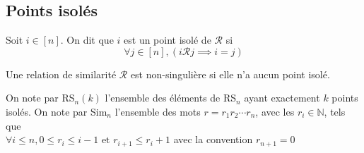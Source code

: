 
\subsection{Points isolés}
\begin{definition}
	\begin{rm}
		Soit $i \in [n]$. On dit que $i$ est un point isolé de $\mathcal{R}$ si \\
		$$\forall j \in [n], (i\mathcal{R} j\implies i=j) $$
	\end{rm}
\end{definition}
\begin{definition}
	\begin{rm}
		Une relation de similarité $\mathcal{R}$ est non-singulière si elle n'a aucun point
		isolé.
	\end{rm}
\end{definition}
On note par RS$_{n}(k)$ l'ensemble des éléments de RS$_{n}$ ayant exactement $k$ points isolés.
On note par Sim$_{n}$ l'ensemble des mots $r=r_{1} r_{2}\cdots r_{n}$, avec les $r_{i}\in\mathbb{N}$, tels que \\
$\forall i\leq n, 0\leq r_{i} \leq i-1 \text{ et }  r_{i+1}\leq r_{i}+1$ avec la convention $r_{n+1}=0$
\newpage

